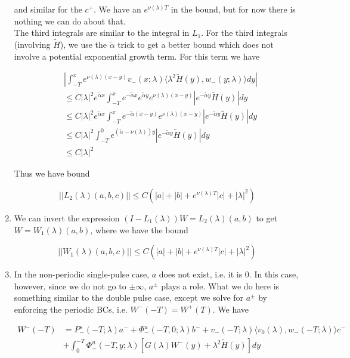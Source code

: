 \documentclass[12pt]{article}
\begin{document}
\begin{enumerate}
and similar for the $c^+$. We have an $e^{\nu(\lambda)T}$ in the bound, but for now there is nothing we can do about that.
\\

The third integrals are similar to the integral in $L_1$. For the third integrals (involving $\tilde{H}$), we use the $\tilde{\alpha}$ trick to get a better bound which does not involve a potential exponential growth term. For this term we have

\begin{align*}
&\left| \int_{-T}^x 
e^{\nu(\lambda)(x-y)} v_-(x; \lambda) \langle \lambda^2 \tilde{H}(y), w_-(y; \lambda) \rangle dy \right| \\
&\leq C |\lambda|^2 e^{\tilde{\alpha}x} \int_{-T}^x e^{-\tilde{\alpha}x} e^{\tilde{\alpha}y} e^{\nu(\lambda)(x-y)} |e^{-\tilde{\alpha}y}\tilde{H}(y)|dy \\
&\leq C |\lambda|^2 e^{\tilde{\alpha}x} \int_{-T}^x e^{-\tilde{\alpha}(x-y)} e^{\nu(\lambda)(x-y)} |e^{-\tilde{\alpha}y}\tilde{H}(y)|dy \\
&\leq C |\lambda|^2 \int_{-T}^0 e^{(\tilde{\alpha}-\nu(\lambda))y} |e^{-\tilde{\alpha}y}\tilde{H}(y)|dy \\
&\leq C |\lambda|^2
\end{align*}

Thus we have bound

\[
||L_2(\lambda)(a,b,c)|| \leq C (|a| + |b| + e^{\nu(\lambda)T} |c| + |\lambda|^2)
\]


\item We can invert the expression $(I - L_1(\lambda))W = L_2(\lambda)(a,b)$ to get $W = W_1(\lambda)(a,b)$, where we have the bound

\[
||W_1(\lambda)(a,b,c)|| \leq C (|a| + |b| + e^{\nu(\lambda)T}|c| + |\lambda|^2)
\]

\item In the non-periodic single-pulse case, $a$ does not exist, i.e. it is 0. In this case, however, since we do not go to $\pm \infty$, $a^\pm$ plays a role. What we do here is something similar to the double pulse case, except we solve for $a^\pm$ by enforcing the periodic BCs, i.e. $W^-(-T) = W^+(T)$. We have 

\begin{align*}
W^-(-T) &= P^s_-(-T; \lambda)a^- + \Phi^u_-(-T, 0; \lambda)b^- + v_-(-T; \lambda) \langle v_0(\lambda), w_-(-T; \lambda) \rangle c^- \\
&+ \int_0^{-T} \Phi^u_-(-T, y; \lambda)[ G(\lambda)W^-(y) + \lambda^2 \tilde{H}(y) ] dy \\
\end{align*}


\end{enumerate}
\end{document}
